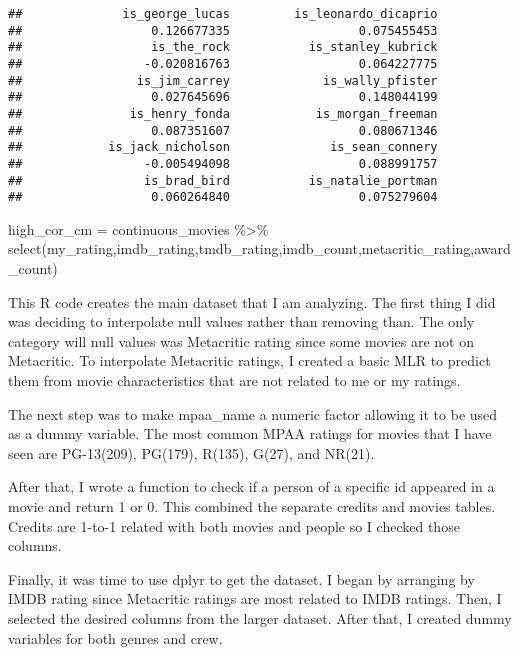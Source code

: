 \documentclass[
]{article}
\newenvironment{Shaded}{\begin{snugshade}}{\end{snugshade}}
\newcommand{\FunctionTok}[1]{\textcolor[rgb]{0.00,0.00,0.00}{#1}}
\newcommand{\NormalTok}[1]{#1}
\newcommand{\OtherTok}[1]{\textcolor[rgb]{0.56,0.35,0.01}{#1}}
\newcommand{\SpecialCharTok}[1]{\textcolor[rgb]{0.00,0.00,0.00}{#1}}
\begin{document}
\begin{verbatim}
##              is_george_lucas         is_leonardo_dicaprio 
##                  0.126677335                  0.075455453 
##                  is_the_rock           is_stanley_kubrick 
##                 -0.020816763                  0.064227775 
##                is_jim_carrey             is_wally_pfister 
##                  0.027645696                  0.148044199 
##               is_henry_fonda            is_morgan_freeman 
##                  0.087351607                  0.080671346 
##            is_jack_nicholson              is_sean_connery 
##                 -0.005494098                  0.088991757 
##                 is_brad_bird           is_natalie_portman 
##                  0.060264840                  0.075279604
\end{verbatim}

\begin{Shaded}
\begin{Highlighting}[]
\NormalTok{high\_cor\_cm }\OtherTok{=}\NormalTok{ continuous\_movies }\SpecialCharTok{\%\textgreater{}\%} \FunctionTok{select}\NormalTok{(my\_rating,imdb\_rating,tmdb\_rating,imdb\_count,metacritic\_rating,award\_count)}
\end{Highlighting}
\end{Shaded}

This R code creates the main dataset that I am analyzing. The first
thing I did was deciding to interpolate null values rather than removing
than. The only category will null values was Metacritic rating since
some movies are not on Metacritic. To interpolate Metacritic ratings, I
created a basic MLR to predict them from movie characteristics that are
not related to me or my ratings.

The next step was to make mpaa\_name a numeric factor allowing it to be
used as a dummy variable. The most common MPAA ratings for movies that I
have seen are PG-13(209), PG(179), R(135), G(27), and NR(21).

After that, I wrote a function to check if a person of a specific id
appeared in a movie and return 1 or 0. This combined the separate
credits and movies tables. Credits are 1-to-1 related with both movies
and people so I checked those columns.

Finally, it was time to use dplyr to get the dataset. I began by
arranging by IMDB rating since Metacritic ratings are most related to
IMDB ratings. Then, I selected the desired columns from the larger
dataset. After that, I created dummy variables for both genres and crew.
\end{document}

